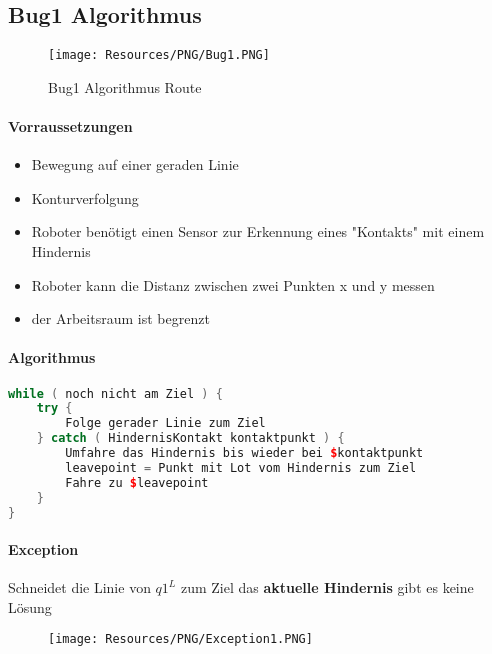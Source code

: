 \pagebreak
\subsection{Bug1 Algorithmus}
{
\begin{wrapfigure}{r}{0.4\textwidth}
	\vspace{-1cm}
	\texttt{[image: Resources/PNG/Bug1.PNG]}
	\caption{Bug1 Algorithmus Route}
	\label{fig:PNG/Bug1.png}
\end{wrapfigure}
\paragraph{Vorraussetzungen}
\begin{itemize}
	\item Bewegung auf einer geraden Linie
	\item Konturverfolgung
	\item Roboter benötigt einen Sensor zur Erkennung eines "Kontakts" mit einem
		Hindernis
	\item Roboter kann die Distanz zwischen zwei Punkten x und y messen
	\item der Arbeitsraum ist begrenzt
\end{itemize}

}

\paragraph{Algorithmus}
\begin{lstlisting}[language=c++, caption={}]
while ( noch nicht am Ziel ) {
	try {
		Folge gerader Linie zum Ziel
	} catch ( HindernisKontakt kontaktpunkt ) {
		Umfahre das Hindernis bis wieder bei $kontaktpunkt
		leavepoint = Punkt mit Lot vom Hindernis zum Ziel
		Fahre zu $leavepoint
	}
}
\end{lstlisting}

\paragraph{Exception}
Schneidet die Linie von $q1^L$ zum Ziel das \textbf{aktuelle Hindernis} gibt
es keine Lösung
\begin{figure}[H]
	\begin{center}
		\texttt{[image: Resources/PNG/Exception1.PNG]}
		\caption{}
		\label{fig:PNG/Exception1.PNG}
	\end{center}
\end{figure}

